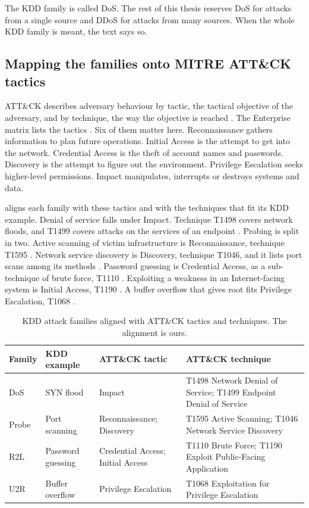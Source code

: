 The KDD family is called DoS. The rest of this thesis reserves DoS for
attacks from a single source and DDoS for attacks from many sources. When the
whole KDD family is meant, the text says so.

\subsection{Mapping the families onto MITRE ATT\&CK tactics}
\label{sec:families-attack-mapping}

ATT\&CK describes adversary behaviour by tactic, the tactical objective of
the adversary, and by technique, the way the objective is reached
\citep{strom2020attack}. The Enterprise matrix lists the tactics
\citep{mitre2026tactics}. Six of them matter here. Reconnaissance gathers
information to plan future operations. Initial Access is the attempt to get
into the network. Credential Access is the theft of account names and
passwords. Discovery is the attempt to figure out the environment. Privilege
Escalation seeks higher-level permissions. Impact manipulates, interrupts or
destroys systems and data.

 aligns each family with these tactics and with
the techniques that fit its KDD example. Denial of service falls under
Impact. Technique T1498 covers network floods, and T1499 covers attacks on
the services of an endpoint
\citep{mitre2025t1498,mitre2025t1499}. Probing is split in two. Active
scanning of victim infrastructure is Reconnaissance, technique T1595
\citep{mitre2025t1595}. Network service discovery is Discovery, technique
T1046, and it lists port scans among its methods \citep{mitre2026t1046}.
Password guessing is Credential Access, as a sub-technique of brute force,
T1110 \citep{mitre2026t1110}. Exploiting a weakness in an Internet-facing
system is Initial Access, T1190 \citep{mitre2026t1190}. A buffer overflow that
gives root fits Privilege Escalation, T1068 \citep{mitre2025t1068}.

\begin{table}[t]
\centering
\small
\caption{KDD attack families aligned with ATT\&CK tactics and techniques.
The alignment is ours.}
\label{tab:kdd-attack-mapping}
\begin{tabular}{@{}p{1.3cm}p{2.7cm}p{3cm}p{5.2cm}@{}}
\toprule
Family & KDD example & ATT\&CK tactic & ATT\&CK technique \\
\midrule
DoS   & SYN flood & Impact
      & T1498 Network Denial of Service; T1499 Endpoint Denial of Service \\
Probe & Port scanning & Reconnaissance; Discovery
      & T1595 Active Scanning; T1046 Network Service Discovery \\
R2L   & Password guessing & Credential Access; Initial Access
      & T1110 Brute Force; T1190 Exploit Public-Facing Application \\
U2R   & Buffer overflow & Privilege Escalation
      & T1068 Exploitation for Privilege Escalation \\
\bottomrule
\end{tabular}
\end{table}

